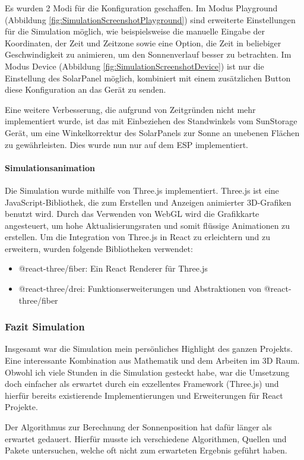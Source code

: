  Es wurden 2 Modi für die Konfiguration geschaffen.
 Im Modus Playground (Abbildung \ref{fig:SimulationScreenshotPlayground}) sind erweiterte Einstellungen für die Simulation möglich, wie beispielsweise die manuelle Eingabe der Koordinaten, der Zeit und Zeitzone sowie eine Option, die Zeit in beliebiger Geschwindigkeit zu animieren, um den Sonnenverlauf besser zu betrachten.
 Im Modus Device (Abbildung \ref{fig:SimulationScreenshotDevice}) ist nur die Einstellung des SolarPanel möglich, kombiniert mit einem zusätzlichen Button diese Konfiguration an das Gerät zu senden.

Eine weitere Verbesserung, die aufgrund von Zeitgründen nicht mehr implementiert wurde, ist das mit Einbeziehen des Standwinkels vom SunStorage Gerät, um eine Winkelkorrektur des SolarPanels zur Sonne an unebenen Flächen zu gewährleisten. Dies wurde nun nur auf dem ESP implementiert.

\paragraph{Simulationsanimation}

Die Simulation wurde mithilfe von Three.js implementiert. Three.js ist eine JavaScript-Bibliothek, die zum Erstellen und Anzeigen animierter 3D-Grafiken benutzt wird. Durch das Verwenden von WebGL wird die Grafikkarte angesteuert, um hohe Aktualisierungsraten und somit flüssige Animationen zu erstellen.
Um die Integration von Three.js in React zu erleichtern und zu erweitern, wurden folgende Bibliotheken verwendet:
\begin{itemize}
    \item @react-three/fiber: Ein React Renderer für Three.js
    \item @react-three/drei: Funktionserweiterungen und Abstraktionen von @react-three/fiber
\end{itemize}

\subsubsection{Fazit Simulation}

Insgesamt war die Simulation mein persönliches Highlight des ganzen Projekts. Eine interessante Kombination aus Mathematik und dem Arbeiten im 3D Raum. Obwohl ich viele Stunden in die Simulation gesteckt habe, war die Umsetzung doch einfacher als erwartet durch ein exzellentes Framework (Three.js) und hierfür bereits existierende Implementierungen und Erweiterungen für React Projekte.

Der Algorithmus zur Berechnung der Sonnenposition hat dafür länger als erwartet gedauert. Hierfür musste ich verschiedene Algorithmen, Quellen und Pakete untersuchen, welche oft nicht zum erwarteten Ergebnis geführt haben.
